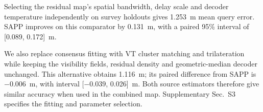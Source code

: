 Selecting the residual map's spatial bandwidth, delay scale and decoder temperature independently on survey holdouts gives 1.253~m mean query error. SAPP improves on this comparator by 0.131~m, with a paired 95\% interval of [0.089, 0.172]~m.

We also replace consensus fitting with VT cluster matching and trilateration while keeping the visibility fields, residual density and geometric-median decoder unchanged. This alternative obtains 1.116~m; its paired difference from SAPP is $-0.006$~m, with interval [$-0.039$, 0.026]~m. Both source estimators therefore give similar accuracy when used in the combined map. Supplementary Sec.~S3 specifies the fitting and parameter selection.
